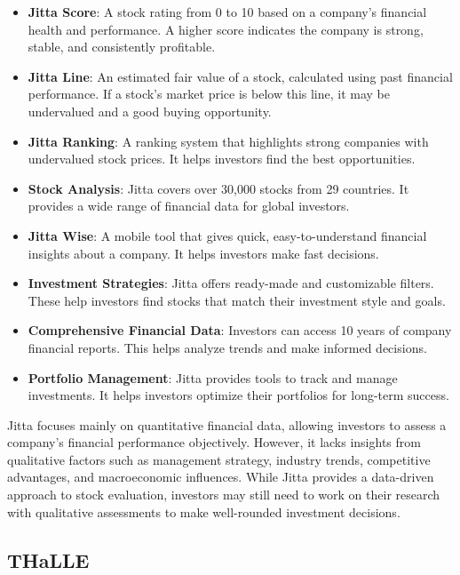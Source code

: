 \begin{itemize}[leftmargin=60pt]
    \item \textbf{Jitta Score}: A stock rating from 0 to 10 based on a company’s financial health and performance. A higher score indicates the company is strong, stable, and consistently profitable.
    \item \textbf{Jitta Line}: An estimated fair value of a stock, calculated using past financial performance. If a stock’s market price is below this line, it may be undervalued and a good buying opportunity.
    \item \textbf{Jitta Ranking}: A ranking system that highlights strong companies with undervalued stock prices. It helps investors find the best opportunities.
    \item \textbf{Stock Analysis}: Jitta covers over 30,000 stocks from 29 countries. It provides a wide range of financial data for global investors.
    \item \textbf{Jitta Wise}: A mobile tool that gives quick, easy-to-understand financial insights about a company. It helps investors make fast decisions.
    \item \textbf{Investment Strategies}: Jitta offers ready-made and customizable filters. These help investors find stocks that match their investment style and goals.
    \item \textbf{Comprehensive Financial Data}: Investors can access 10 years of company financial reports. This helps analyze trends and make informed decisions.
    \item \textbf{Portfolio Management}: Jitta provides tools to track and manage investments. It helps investors optimize their portfolios for long-term success.
\end{itemize}

Jitta focuses mainly on quantitative financial data, allowing investors to assess a company’s financial performance objectively. 
However, it lacks insights from qualitative factors such as management strategy, industry trends, competitive advantages, and macroeconomic influences. 
While Jitta provides a data-driven approach to stock evaluation, investors may still need to work on their research with qualitative assessments to make well-rounded investment decisions\cite{JittaWebsite}.

\newpage

\subsection{THaLLE}
\label{subsection:thalle}

